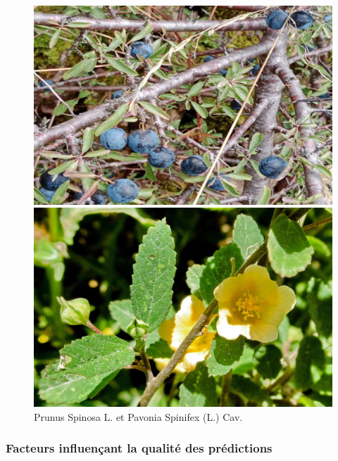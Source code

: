 \documentclass[a4paper,12pt]{article}
\begin{document}
\begin{figure}[H]
\centering
\begin{minipage}{0.5\textwidth}
  \includegraphics[width=0.9\linewidth]{images/prunus_spinosa.jpeg}
\end{minipage}%
\begin{minipage}{0.5\textwidth}
  \includegraphics[width=0.9\linewidth]{images/pavonia_spinifex.jpeg}
\end{minipage}
\caption{Prunus Spinosa L. et Pavonia Spinifex (L.) Cav.}
\label{fig:prunus}
\end{figure}

\subsubsection{Facteurs influençant la qualité des prédictions}
\end{document}

